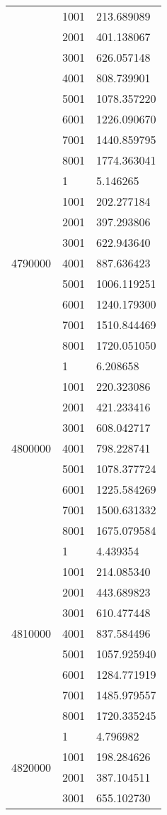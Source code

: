 \begin{table}[htb!]
\begin{tabular}{lll}
 & 1001 & 213.689089 \\
 & 2001 & 401.138067 \\
 & 3001 & 626.057148 \\
 & 4001 & 808.739901 \\
 & 5001 & 1078.357220 \\
 & 6001 & 1226.090670 \\
 & 7001 & 1440.859795 \\
 & 8001 & 1774.363041 \\
\multirow[c]{9}{*}{4790000} & 1 & 5.146265 \\
 & 1001 & 202.277184 \\
 & 2001 & 397.293806 \\
 & 3001 & 622.943640 \\
 & 4001 & 887.636423 \\
 & 5001 & 1006.119251 \\
 & 6001 & 1240.179300 \\
 & 7001 & 1510.844469 \\
 & 8001 & 1720.051050 \\
\multirow[c]{9}{*}{4800000} & 1 & 6.208658 \\
 & 1001 & 220.323086 \\
 & 2001 & 421.233416 \\
 & 3001 & 608.042717 \\
 & 4001 & 798.228741 \\
 & 5001 & 1078.377724 \\
 & 6001 & 1225.584269 \\
 & 7001 & 1500.631332 \\
 & 8001 & 1675.079584 \\
\multirow[c]{9}{*}{4810000} & 1 & 4.439354 \\
 & 1001 & 214.085340 \\
 & 2001 & 443.689823 \\
 & 3001 & 610.477448 \\
 & 4001 & 837.584496 \\
 & 5001 & 1057.925940 \\
 & 6001 & 1284.771919 \\
 & 7001 & 1485.979557 \\
 & 8001 & 1720.335245 \\
\multirow[c]{9}{*}{4820000} & 1 & 4.796982 \\
 & 1001 & 198.284626 \\
 & 2001 & 387.104511 \\
 & 3001 & 655.102730 \\

\end{tabular}
\end{table}
